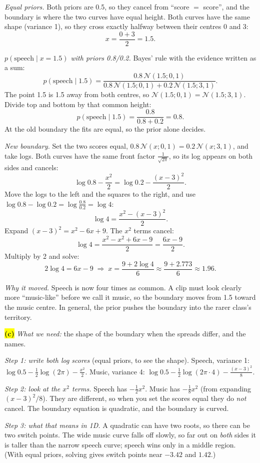 \documentclass[12pt,a4paper]{article}
\begin{document}
\emph{Equal priors.} Both priors are 0.5, so they cancel from ``score $=$ score'', and the boundary is where the two curves have equal height. Both curves have the same shape (variance 1), so they cross exactly halfway between their centres 0 and 3:
\[
x=\frac{0+3}{2}=1.5 .
\]

\emph{$p(\text{speech}\mid x=1.5)$ with priors 0.8/0.2.} Bayes' rule with the evidence written as a sum:
\[
p(\text{speech}\mid1.5)=\frac{0.8\,\mathcal{N}(1.5;0,1)}{0.8\,\mathcal{N}(1.5;0,1)+0.2\,\mathcal{N}(1.5;3,1)} .
\]
The point 1.5 is 1.5 away from both centres, so $\mathcal{N}(1.5;0,1)=\mathcal{N}(1.5;3,1)$. Divide top and bottom by that common height:
\[
p(\text{speech}\mid1.5)=\frac{0.8}{0.8+0.2}=0.8 .
\]
At the old boundary the fits are equal, so the prior alone decides.

\emph{New boundary.} Set the two scores equal, $0.8\,\mathcal{N}(x;0,1)=0.2\,\mathcal{N}(x;3,1)$, and take logs. Both curves have the same front factor $\frac{1}{\sqrt{2\pi}}$, so its log appears on both sides and cancels:
\[
\log0.8-\frac{x^2}{2}=\log0.2-\frac{(x-3)^2}{2}.
\]
Move the logs to the left and the squares to the right, and use $\log0.8-\log0.2=\log\frac{0.8}{0.2}=\log4$:
\[
\log4=\frac{x^2-(x-3)^2}{2}.
\]
Expand $(x-3)^2=x^2-6x+9$. The $x^2$ terms cancel:
\[
\log4=\frac{x^2-x^2+6x-9}{2}=\frac{6x-9}{2}.
\]
Multiply by 2 and solve:
\[
2\log4=6x-9\;\Rightarrow\;x=\frac{9+2\log4}{6}\approx\frac{9+2.773}{6}\approx1.96 .
\]

\emph{Why it moved.} Speech is now four times as common. A clip must look clearly more ``music-like'' before we call it music, so the boundary moves from 1.5 toward the music centre. In general, the prior pushes the boundary into the rarer class's territory.

\colorbox{yellow}{\textbf{(c)}} \emph{What we need:} the shape of the boundary when the spreads differ, and the names.

\emph{Step 1: write both log scores} (equal priors, to see the shape). Speech, variance 1: $\log0.5-\frac12\log(2\pi)-\frac{x^2}{2}$. Music, variance 4: $\log0.5-\frac12\log(2\pi\cdot4)-\frac{(x-3)^2}{8}$.

\emph{Step 2: look at the $x^2$ terms.} Speech has $-\frac12x^2$. Music has $-\frac18x^2$ (from expanding $(x-3)^2/8$). They are different, so when you set the scores equal they do \emph{not} cancel. The boundary equation is quadratic, and the boundary is curved.

\emph{Step 3: what that means in 1D.} A quadratic can have two roots, so there can be two switch points. The wide music curve falls off slowly, so far out on \emph{both} sides it is taller than the narrow speech curve; speech wins only in a middle region. (With equal priors, solving gives switch points near $-3.42$ and $1.42$.)
\end{document}
